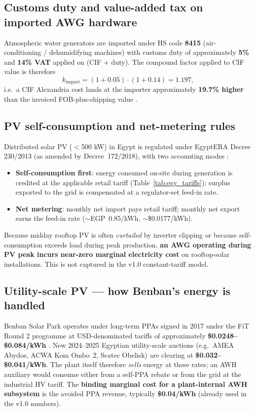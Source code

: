 \documentclass[11pt,a4paper]{article}
\begin{document}
\subsection{Customs duty and value-added tax on imported AWG hardware}
Atmospheric water generators are imported under HS code \textbf{8415} (air-conditioning / dehumidifying machines) with customs duty of approximately \textbf{5\%} \citep{egypt_customs_2024} and \textbf{14\% VAT} \citep{egypt_tax_authority_vat_2024} applied on (CIF + duty). The compound factor applied to CIF value is therefore
\begin{equation}
k_{\mathrm{import}} = (1 + 0.05)\cdot (1 + 0.14) = 1.197,
\label{eq:import_factor}
\end{equation}
i.e.\ a CIF Alexandria cost lands at the importer approximately \textbf{19.7\% higher} than the invoiced FOB-plus-shipping value \citep{egypt_customs_2024}.

\subsection{PV self-consumption and net-metering rules}
Distributed solar PV ($<$500 kW) in Egypt is regulated under EgyptERA Decree 230/2013 (as amended by Decree~172/2018), with two accounting modes \citep{egyptera_netmetering_2018}:
\begin{itemize}[leftmargin=*]
  \item \textbf{Self-consumption first}: energy consumed on-site during generation is credited at the applicable retail tariff (Table~\ref{tab:egy_tariffs}); surplus exported to the grid is compensated at a regulator-set feed-in rate.
  \item \textbf{Net metering}: monthly net import pays retail tariff; monthly net export earns the feed-in rate ($\sim$EGP~0.85/kWh, $\sim$\$0.0177/kWh).
\end{itemize}
Because midday rooftop PV is often \emph{curtailed} by inverter clipping or because self-consumption exceeds load during peak production, \textbf{an AWG operating during PV peak incurs near-zero marginal electricity cost} on rooftop-solar installations. This is not captured in the v1.0 constant-tariff model.

\subsection{Utility-scale PV --- how Benban's energy is handled}
Benban Solar Park operates under long-term PPAs signed in 2017 under the FiT Round 2 programme at USD-denominated tariffs of approximately \textbf{\$0.0248--\$0.084/kWh} \citep{benban_irena_case_2019}. New 2024--2025 Egyptian utility-scale auctions (e.g.\ AMEA Abydos, ACWA Kom Ombo~2, Scatec Obelisk) are clearing at \textbf{\$0.032--\$0.041/kWh}. The plant itself therefore \emph{sells} energy at these rates; an AWH auxiliary would consume either from a self-PPA rebate or from the grid at the industrial HV tariff. The \textbf{binding marginal cost for a plant-internal AWH subsystem} is the avoided PPA revenue, typically \textbf{\$0.04/kWh} (already used in the v1.0 numbers).
\end{document}
